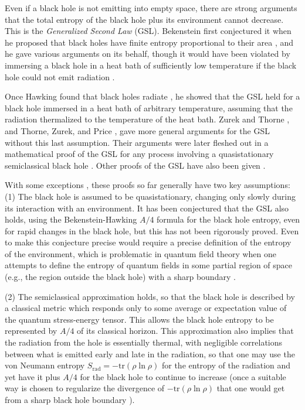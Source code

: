 \documentclass[12pt]{article} \usepackage{latexsym} \textwidth 15cm
\begin{document}
Even if a black hole is not emitting into empty space, there are
strong arguments that the total entropy of the black hole plus its
environment cannot decrease.  This is the {\it Generalized Second Law}
(GSL).  Bekenstein first conjectured it when he proposed that black
holes have finite entropy proportional to their area
\cite{Bek1,Bek2,Bek3,Bek4}, and he gave various arguments on its
behalf, though it would have been violated by immersing a black hole
in a heat bath of sufficiently low temperature if the black hole could
not emit radiation \cite{BCH}.

Once Hawking found that black holes radiate \cite{Haw1,Haw2}, he
showed that the GSL held for a black hole immersed in a heat bath of
arbitrary temperature, assuming that the radiation thermalized to the
temperature of the heat bath.  Zurek and Thorne \cite{ZT}, and Thorne,
Zurek, and Price \cite{TZP}, gave more general arguments for the GSL
without this last assumption.  Their arguments were later fleshed out
in a mathematical proof of the GSL for any process involving a
quasistationary semiclassical black hole \cite{FP}.  Other proofs of
the GSL have also been given \cite{Sor1,Sor2,Waldbook,Sor3}.

With some exceptions \cite{Sor2,Sor3}, these proofs so far generally
have two key assumptions: (1) The black hole is assumed to be
quasistationary, changing only slowly during its interaction with an
environment.  It has been conjectured \cite{TZP} that the GSL also
holds, using the Bekenstein-Hawking $A/4$ formula for the black hole
entropy, even for rapid changes in the black hole, but this has not
been rigorously proved.  Even to make this conjecture precise would
require a precise definition of the entropy of the environment, which
is problematic in quantum field theory when one attempts to define the
entropy of quantum fields in some partial region of space (e.g., the
region outside the black hole) with a sharp boundary \cite{BKLS,Sred}.

(2) The semiclassical approximation holds, so that the black hole is
described by a classical metric which responds only to some average or
expectation value of the quantum stress-energy tensor.  This allows
the black hole entropy to be represented by $A/4$ of its classical
horizon.  This approximation also implies that the radiation from the
hole is essentially thermal, with negligible correlations between what
is emitted early and late in the radiation, so that one may use the
von Neumann entropy $S_{\mathrm{rad}} = -{\mathrm{tr}}(\rho\ln\rho)$
for the entropy of the radiation and yet have it plus $A/4$ for the
black hole to continue to increase (once a suitable way is chosen to
regularize the divergence of $-{\mathrm{tr}}(\rho\ln\rho)$ that one
would get from a sharp black hole boundary \cite{BKLS,Sred}).
\end{document}

